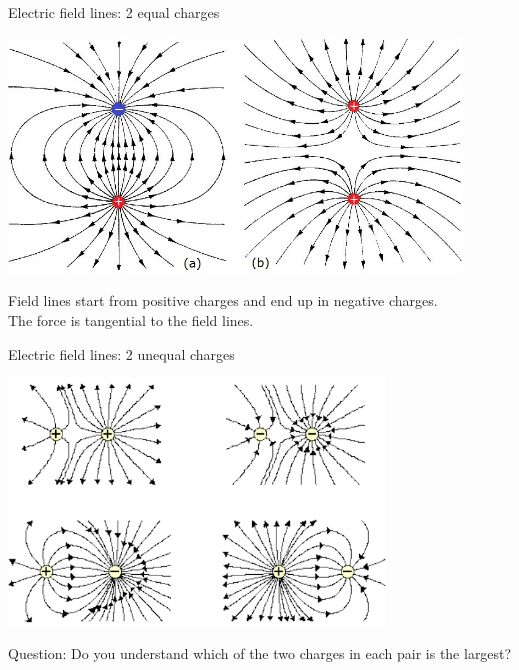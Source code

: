 %
%

\begin{frame}{Electric field lines: 2 equal charges}

\begin{center}
 \includegraphics[width=0.90\textwidth]{./images/schematics/electric_field_lines_2_equal_charges_pp_and_np.jpg}
\end{center}

{\small
Field lines start from positive charges and end up in negative charges.\\
The force is tangential to the field lines.
}

\end{frame}

%
%

\begin{frame}{Electric field lines: 2 unequal charges}

\begin{center}
 \includegraphics[width=0.75\textwidth]{./images/schematics/electric_field_lines_2_unequal_charges.png}
\end{center}

{\small
Question: Do you understand which of the two charges in each pair is the largest?
}

\end{frame}

